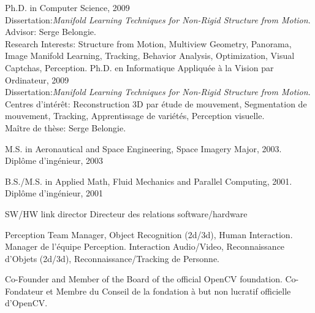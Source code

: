 \documentclass{article}
\begin{document}


\begin{llist}

 
{
Ph.D. in Computer Science, 2009\\
Dissertation:\textit{Manifold Learning Techniques for Non-Rigid Structure from
Motion}.\\
Advisor: Serge Belongie.\\
Research Interests: Structure from Motion, Multiview Geometry, Panorama, Image Manifold Learning, Tracking, Behavior Analysis, Optimization, Visual Captchas, Perception.
}
{
Ph.D. en Informatique Appliqu\'{e}e \`{a} la Vision par Ordinateur, 2009\\
Dissertation:\textit{Manifold Learning Techniques for Non-Rigid Structure from
Motion}.\\
Centres d'int\'{e}r\^{e}t: Reconstruction 3D par \'{e}tude de mouvement, Segmentation de mouvement, Tracking, 
Apprentissage de vari\'{e}t\'{e}s, Perception visuelle.\\
Ma\^{i}tre de th\`{e}se: Serge Belongie.
}

 
{
M.S. in Aeronautical and Space Engineering, Space Imagery Major, 2003.
}
{
Dipl\^{o}me d'ing\'{e}nieur, 2003
}

 
{
B.S./M.S. in Applied Math, Fluid Mechanics and Parallel Computing, 2001.
}
{
Dipl\^{o}me d'ing\'{e}nieur, 2001
}

{
}
{
}

{
SW/HW link director
}
{
Directeur des relations software/hardware
}

{
Perception Team Manager, Object Recognition (2d/3d), Human Interaction.
}
{
Manager de l'\'{e}quipe Perception. Interaction Audio/Video, Reconnaissance d'Objets (2d/3d), Reconnaissance/Tracking de 
Personne.
}

{
Co-Founder and Member of the Board of the official OpenCV foundation.
}
{
Co-Fondateur et Membre du Conseil de la fondation \`{a} but non lucratif officielle d'OpenCV.
}


\end{llist}
\end{document}
